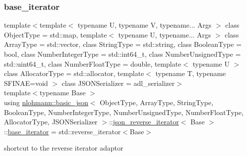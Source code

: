 \subsubsection{\texorpdfstring{base\_iterator}{base\_iterator}}
{\footnotesize\ttfamily template$<$template$<$ typename U, typename V, typename... Args $>$ class Object\+Type = std\+::map, template$<$ typename U, typename... Args $>$ class Array\+Type = std\+::vector, class String\+Type  = std\+::string, class Boolean\+Type  = bool, class Number\+Integer\+Type  = std\+::int64\+\_\+t, class Number\+Unsigned\+Type  = std\+::uint64\+\_\+t, class Number\+Float\+Type  = double, template$<$ typename U $>$ class Allocator\+Type = std\+::allocator, template$<$ typename T, typename S\+F\+I\+N\+A\+E=void $>$ class J\+S\+O\+N\+Serializer = adl\+\_\+serializer$>$ \\
template$<$typename Base $>$ \\
using \mbox{\hyperlink{classnlohmann_1_1basic__json}{nlohmann\+::basic\+\_\+json}}$<$ Object\+Type, Array\+Type, String\+Type, Boolean\+Type, Number\+Integer\+Type, Number\+Unsigned\+Type, Number\+Float\+Type, Allocator\+Type, J\+S\+O\+N\+Serializer $>$\+::\mbox{\hyperlink{classnlohmann_1_1basic__json_1_1json__reverse__iterator}{json\+\_\+reverse\+\_\+iterator}}$<$ Base $>$\+::\mbox{\hyperlink{classnlohmann_1_1basic__json_1_1json__reverse__iterator_a5b7f3c5d86fe89a65d9552c1cac37261}{base\+\_\+iterator}} =  std\+::reverse\+\_\+iterator$<$Base$>$}



shortcut to the reverse iterator adaptor 

\mbox{\label{classnlohmann_1_1basic__json_1_1json__reverse__iterator_ab0021ef2007fd338615360af404dcd4e}} 
